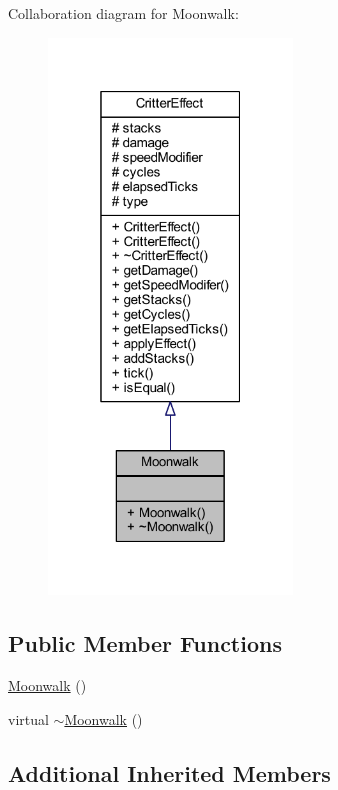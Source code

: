 Collaboration diagram for Moonwalk\+:\nopagebreak
\begin{figure}[H]
\begin{center}
\leavevmode
\includegraphics[width=184pt]{struct_moonwalk__coll__graph}
\end{center}
\end{figure}
\subsection*{Public Member Functions}
\begin{DoxyCompactItemize}
\item 
\hyperlink{struct_moonwalk_a20553c4bda79a628e8cfe34440814c98}{Moonwalk} ()
\item 
virtual \hyperlink{struct_moonwalk_a1300a2298ea2da2bce19f83fe2b2381c}{$\sim$\+Moonwalk} ()
\end{DoxyCompactItemize}
\subsection*{Additional Inherited Members}


